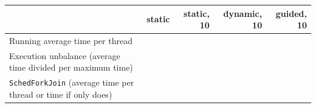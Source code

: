 \documentclass[a4paper]{article}
\begin{document}
\begin{table}[H]
	\centering
	\tablinesep=0.5cm
	\begin{tabular}{p{5cm}|rrrr}
		& \textbf{static} & \textbf{static, 10} & \textbf{dynamic, 10} & \textbf{guided, 10} \\
		\hline
		Running average time per thread & & & & \\
		Execution unbalance (average time divided per maximum time) & & & & \\
		\texttt{SchedForkJoin} (average time per thread or time if only does)
	\end{tabular}
\end{table}
\end{document}
